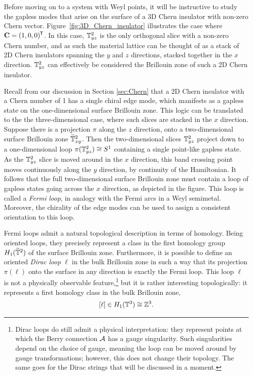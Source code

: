 Before moving on to a system with Weyl points, it will be instructive to study the gapless modes that arise on the surface of a 3D Chern insulator with non-zero Chern vector. Figure~\ref{fig:3D_Chern_insulator} illustrates the case where $\vb{C} = (1,0,0)^{\mkern-1.5mu\mathsf{T}}$. In this case, $\mathbb{T}_{yz}^2$ is the only orthogonal slice with a non-zero Chern number, and as such the material lattice can be thought of as a stack of 2D Chern insulators spanning the $y$ and $z$ directions, stacked together in the $x$ direction. $\mathbb{T}_{yz}^2$ can effectively be considered the Brillouin zone of such a 2D Chern insulator.

Recall from our discussion in Section \ref{sec:Chern} that a 2D Chern insulator with a Chern number of 1 has a single chiral edge mode, which manifests as a gapless state on the one-dimensional surface Brillouin zone. This logic can be translated to the the three-dimensional case, where such slices are stacked in the $x$ direction. Suppose there is a projection $\pi$ along the $z$ direction, onto a two-dimensional surface Brillouin zone $\widetilde{\mathbb{T}}_{xy}^2$. Then the two-dimensional slices $\mathbb{T}_{yz}^2$ project down to a one-dimensional loop $\pi(\mathbb{T}_{yz}^2)\cong S^1$ containing a single point-like gapless state. As the $\mathbb{T}_{yz}^2$ slice is moved around in the $x$ direction, this band crossing point moves continuously along the $y$ direction, by continuity of the Hamiltonian. It follows that the full two-dimensional surface Brillouin zone must contain a loop of gapless states going across the $x$ direction, as depicted in the figure. This loop is called a \emph{Fermi loop}, in analogy with the Fermi arcs in a Weyl semimetal. Moreover, the chirality of the edge modes can be used to assign a consistent orientation to this loop.

Fermi loops admit a natural topological description in terms of homology. Being oriented loops, they precisely represent a class in the first homology group $H_1(\widetilde{\mathbb{T}}^2)$ of the surface Brillouin zone. Furthermore, it is possible to define an oriented \emph{Dirac loop} $\ell$ in the bulk Brillouin zone in such a way that its projection $\pi(\ell)$ onto the surface in any direction is exactly the Fermi loop. This loop $\ell$ is not a physically observable feature,\footnote{
	Dirac loops do still admit a physical interpretation: they represent points at which the Berry connection $\mathcal{A}$ has a gauge singularity. Such singularities depend on the choice of gauge, meaning the loop can be moved around by gauge transformations; however, this does not change their topology. The same goes for the Dirac strings that will be discussed in a moment.}
but it is rather interesting topologically: it represents a first homology class in the bulk Brillouin zone,
\[
	[\ell]\in H_1(\mathbb{T}^3)\cong\mathbb{Z}^3.
\]

